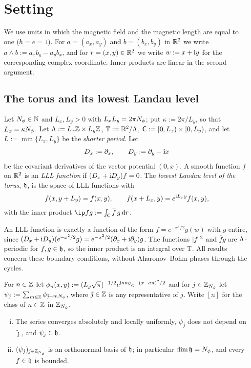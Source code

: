 \section{Setting}\label{sec:setting}

We use units in which the magnetic field and the magnetic length are equal to one ($\hbar=e=1$). For
$a=(a_x,a_y)$ and $b=(b_x,b_y)$ in $\mathbb{R}^2$ we write $a\wedge b:=a_xb_y-a_yb_x$, and for $r=(x,y)\in\mathbb{R}^2$ we write
$w:=x+\mathrm{i} y$ for the corresponding complex coordinate. Inner products are linear in the second argument.

\subsection{The torus and its lowest Landau level}

\begin{definition}\label{def:torus}
Let $N_{\phi}\in\mathbb{N}$ and $L_x,L_y>0$ with $L_xL_y=2\pi N_{\phi}$; put $\kappa:=2\pi/L_y$, so that $L_x=\kappa N_{\phi}$. Let
$\Lambda:=L_x\mathbb{Z}\times L_y\mathbb{Z}$, $\mathbb{T}:=\mathbb{R}^2/\Lambda$, $\mathsf{C}:=[0,L_x)\times[0,L_y)$, and let $L:=\min\{L_x,L_y\}$ be the
\emph{shorter period}. Let
\[
D_x:=\partial_x,\qquad D_y:=\partial_y-\mathrm{i} x
\]
be the covariant derivatives of the vector potential $(0,x)$. A smooth function $f$ on $\mathbb{R}^2$ is an \emph{LLL
function} if $(D_x+\mathrm{i} D_y)f=0$. The \emph{lowest Landau level of the torus}, $\mathfrak{h}$, is the space of LLL functions with
\begin{equation}\label{eq:bc}
f(x,y+L_y)=f(x,y),\qquad f(x+L_x,y)=e^{\mathrm{i} L_xy}f(x,y),
\end{equation}
with the inner product $\ip fg:=\int_\cell\overline f\,g\,\dd r$.
\end{definition}

An LLL function is exactly a function of the form $f=e^{-x^2/2}g(w)$ with $g$ entire, since
$(D_x+\mathrm{i} D_y)(e^{-x^2/2}g)=e^{-x^2/2}(\partial_x+\mathrm{i}\partial_y)g$. The functions $\lvert f\rvert^2$ and $\overline fg$ are
$\Lambda$-periodic for $f,g\in\mathfrak{h}$, so the inner product is an integral over $\mathbb{T}$. All results concern these
boundary conditions, without Aharonov--Bohm phases through the cycles.

\begin{lemma}\label{lem:orbitals}
For $n\in\mathbb{Z}$ let $\phi_n(x,y):=(L_y\sqrt\pi)^{-1/2}e^{\mathrm{i}\kappa ny}e^{-(x-\kappa n)^2/2}$ and for $j\in\mathbb{Z}_{N_{\phi}}$ let
$\psi_j:=\sum_{m\in\mathbb{Z}}\phi_{\tilde\jmath+mN_{\phi}}$, where $\tilde\jmath\in\mathbb{Z}$ is any representative of $j$. Write $[n]$
for the class of $n\in\mathbb{Z}$ in $\mathbb{Z}_{N_{\phi}}$.
\begin{enumerate}[(i)]
\item The series converges absolutely and locally uniformly, $\psi_j$ does not depend on $\tilde\jmath$, and
$\psi_j\in\mathfrak{h}$.
\item $(\psi_j)_{j\in\mathbb{Z}_{N_{\phi}}}$ is an orthonormal basis of $\mathfrak{h}$; in particular $\dim\mathfrak{h}=N_{\phi}$, and every $f\in\mathfrak{h}$ is
bounded.
\end{enumerate}
\end{lemma}


